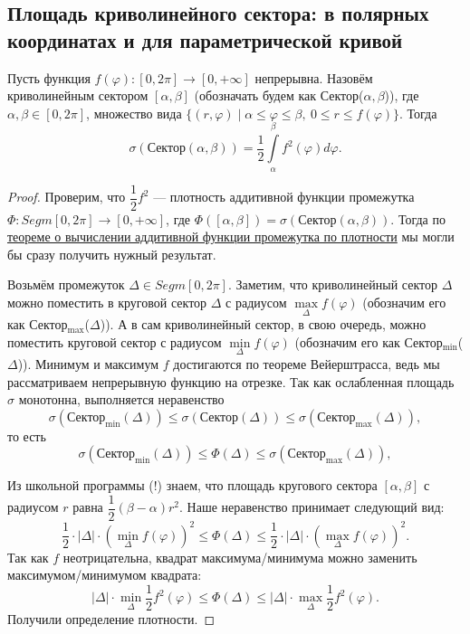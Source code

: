 \subsection{Площадь криволинейного сектора: в полярных координатах и для параметрической кривой}

\begin{theorem}
	Пусть функция \(f(\varphi) \colon [0, 2\pi] \to [0, +\infty]\) непрерывна. Назовём криволинейным сектором \([\alpha, \beta]\) (обозначать будем как Сектор(\(\alpha, \beta\))), где \(\alpha, \beta \in [0, 2\pi]\), множество вида \(\{(r, \varphi) \mid \alpha \leqslant \varphi \leqslant \beta, \ 0 \leqslant r \leqslant f(\varphi)\}\). Тогда
	\begin{equation} \label{sigma_1}
		\sigma(\text{Сектор}(\alpha, \beta)) = \frac{1}{2}\int\limits_\alpha^\beta f^2(\varphi) d\varphi.
	\end{equation}
\end{theorem}

\begin{proof}
	Проверим, что \(\dfrac{1}{2}f^2\) --- плотность аддитивной функции промежутка \(\Phi \colon Segm [0, 2\pi] \to [0, +\infty]\), где \(\Phi([\alpha, \beta]) = \sigma(\text{Сектор}(\alpha, \beta))\). Тогда по \hyperlink{afp}{теореме о вычислении аддитивной функции промежутка по плотности} мы могли бы сразу получить нужный результат.
	
	Возьмём промежуток \(\Delta \in Segm [0, 2\pi]\). Заметим, что криволинейный сектор \(\Delta\) можно поместить в круговой сектор \(\Delta\) с радиусом \(\max\limits_\Delta f(\varphi)\) (обозначим его как Сектор\(_{\max}\)(\(\Delta\))). А в сам криволинейный сектор, в свою очередь, можно поместить круговой сектор с радиусом \(\min\limits_\Delta f(\varphi)\) (обозначим его как Сектор\(_{\min}\)(\(\Delta\))). Минимум и максимум \(f\) достигаются по теореме Вейерштрасса, ведь мы рассматриваем непрерывную функцию на отрезке. Так как ослабленная площадь \(\sigma\) монотонна, выполняется неравенство \[
	\sigma(\text{Сектор}_{\min}(\Delta)) \leqslant \sigma(\text{Сектор}(\Delta)) \leqslant \sigma(\text{Сектор}_{\max}(\Delta)),
	\]
	то есть \[
	\sigma(\text{Сектор}_{\min}(\Delta)) \leqslant \Phi(\Delta) \leqslant \sigma(\text{Сектор}_{\max}(\Delta)),
	\]
	
	Из школьной программы (!) знаем, что площадь кругового сектора \([\alpha, \beta]\) с радиусом \(r\) равна \(\dfrac{1}{2} (\beta - \alpha) r^2\). Наше неравенство принимает следующий вид: \[
	\frac{1}{2} \cdot |\Delta| \cdot (\min_\Delta f(\varphi))^2 \leqslant \Phi(\Delta) \leqslant \frac{1}{2} \cdot |\Delta| \cdot (\max_\Delta f(\varphi))^2.
	\]
	Так как \(f\) неотрицательна, квадрат максимума/минимума можно заменить максимумом/минимумом квадрата: \[
	|\Delta| \cdot \min_\Delta \frac{1}{2} f^2(\varphi) \leqslant \Phi(\Delta) \leqslant |\Delta| \cdot \max_\Delta \frac{1}{2} f^2(\varphi).
	\]
	Получили определение плотности.
\end{proof}

